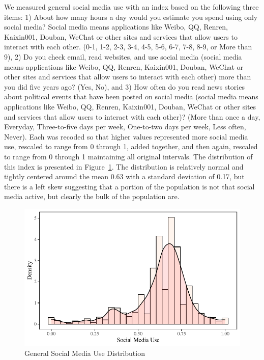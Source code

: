 \documentclass[]{interact}
\theoremstyle{plain}%
\theoremstyle{definition}
\theoremstyle{remark}
\begin{document}
We measured general social media use with an index based on the
following three items: 1) About how many hours a day would you estimate
you spend using only social media? Social media means applications like
Weibo, QQ, Renren, Kaixin001, Douban, WeChat or other sites and services
that allow users to interact with each other. (0-1, 1-2, 2-3, 3-4, 4-5,
5-6, 6-7, 7-8, 8-9, or More than 9), 2) Do you check email, read
websites, and use social media (social media means applications like
Weibo, QQ, Renren, Kaixin001, Douban, WeChat or other sites and services
that allow users to interact with each other) more than you did five
years ago? (Yes, No), and 3) How often do you read news stories about
political events that have been posted on social media (social media
means applications like Weibo, QQ, Renren, Kaixin001, Douban, WeChat or
other sites and services that allow users to interact with each other)?
(More than once a day, Everyday, Three-to-five days per week, One-to-two
days per week, Less often, Never). Each was recoded so that higher
values represented more social media use, rescaled to range from 0
through 1, added together, and then again, rescaled to range from 0
through 1 maintaining all original intervals. The distribution of this
index is presented in Figure~\ref{fig-sm-use-dist}. The distribution is
relatively normal and tightly centered around the mean 0.63 with a
standard deviation of 0.17, but there is a left skew suggesting that a
portion of the population is not that social media active, but clearly
the bulk of the population are.

\begin{figure}

{\centering \includegraphics{Social-Isolation-in-China_files/figure-pdf/fig-sm-use-dist-1.pdf}

}

\caption{\label{fig-sm-use-dist}General Social Media Use Distribution}

\end{figure}
\end{document}
